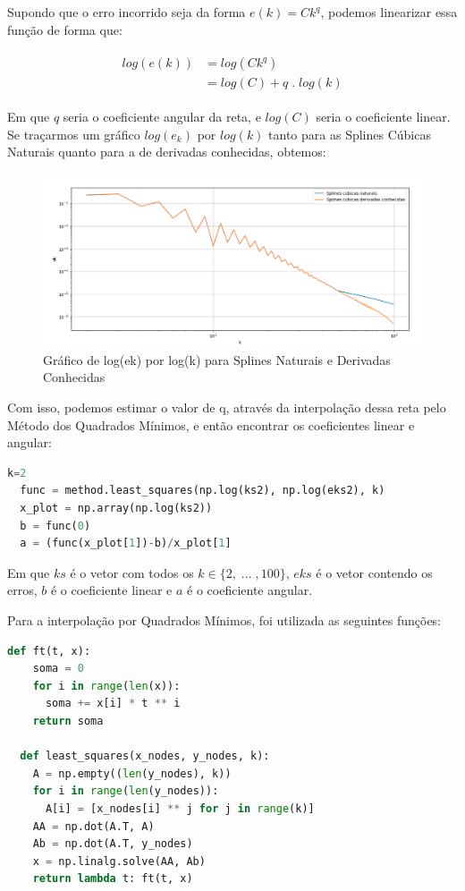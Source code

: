 \documentclass[12pt]{article}
\begin{document}
Supondo que o erro incorrido seja da forma $e(k) = Ck^q$, podemos linearizar essa função de forma que: 

\begin{align}
  \begin{split}
    log(e(k)) & = log(Ck^q) \\
    & = log(C) + q \; . \; log(k)
  \end{split}
\end{align}

Em que $q$ seria o coeficiente angular da reta, e $log(C)$ seria o coeficiente linear.\\
Se traçarmos um gráfico $log(e_k)$ por $log(k)$ tanto para as Splines Cúbicas Naturais quanto para a de derivadas conhecidas, obtemos:

\begin{figure}[H]
  \begin{center}
    \includegraphics[width=0.8\linewidth]{loglog_1.png}
  \end{center}
  \caption{Gráfico de log(ek) por log(k) para Splines Naturais e Derivadas Conhecidas}
  \label{fig:leastsquares1}
\end{figure}

Com isso, podemos estimar o valor de q, através da interpolação dessa reta pelo Método dos Quadrados Mínimos, e então encontrar os coeficientes linear e angular:

\begin{lstlisting}[language=Python]
  k=2
  func = method.least_squares(np.log(ks2), np.log(eks2), k)
  x_plot = np.array(np.log(ks2))
  b = func(0)
  a = (func(x_plot[1])-b)/x_plot[1]
\end{lstlisting}

Em que $ks$ é o vetor com todos os $k \in \{ 2, \; ... \;, 100 \}$, $eks$ é o vetor contendo os erros, $b$ é o coeficiente linear e $a$ é o coeficiente angular.

Para a interpolação por Quadrados Mínimos, foi utilizada as seguintes funções:

\begin{lstlisting}[language=Python]
  def ft(t, x):
    soma = 0
    for i in range(len(x)):
      soma += x[i] * t ** i
    return soma

  def least_squares(x_nodes, y_nodes, k):
    A = np.empty((len(y_nodes), k))
    for i in range(len(y_nodes)):
      A[i] = [x_nodes[i] ** j for j in range(k)]
    AA = np.dot(A.T, A)
    Ab = np.dot(A.T, y_nodes)
    x = np.linalg.solve(AA, Ab)
    return lambda t: ft(t, x)
\end{lstlisting}
\end{document}
